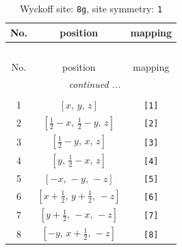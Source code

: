 \documentclass[fleqn,8pt]{jsarticle}
\begin{document}
\renewcommand{\arraystretch}{1.2}
\begin{longtable}{ccc}
\caption{Wyckoff site: {\tt 8g}, site symmetry: {\tt 1}}
 \\
 \hline \hline
No. & position & mapping \\ \hline \endfirsthead

\multicolumn{2}{l}{\tablename\ \thetable{}} \\
 \hline \hline
No. & position & mapping \\ \hline \endhead

 \hline \hline
\multicolumn{2}{r}{\footnotesize\it continued ...} \\ \endfoot

 \hline \hline
\multicolumn{2}{r}{} \\ \endlastfoot

1 & $\left[ x,\, y,\, z \right]$ & {\tt [1]} \\ \hline
2 & $\left[ \frac{1}{2} - x,\, \frac{1}{2} - y,\, z \right]$ & {\tt [2]} \\ \hline
3 & $\left[ \frac{1}{2} - y,\, x,\, z \right]$ & {\tt [3]} \\ \hline
4 & $\left[ y,\, \frac{1}{2} - x,\, z \right]$ & {\tt [4]} \\ \hline
5 & $\left[ - x,\, - y,\, - z \right]$ & {\tt [5]} \\ \hline
6 & $\left[ x + \frac{1}{2},\, y + \frac{1}{2},\, - z \right]$ & {\tt [6]} \\ \hline
7 & $\left[ y + \frac{1}{2},\, - x,\, - z \right]$ & {\tt [7]} \\ \hline
8 & $\left[ - y,\, x + \frac{1}{2},\, - z \right]$ & {\tt [8]} \\
\end{longtable}
\end{document}
